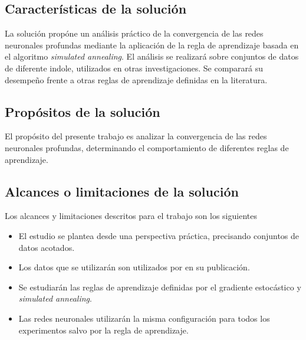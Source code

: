 








\subsection{Características de la solución}
La solución propóne un análisis práctico de la convergencia de las redes neuronales profundas mediante la aplicación de la regla de aprendizaje basada en el algoritmo {\em simulated annealing}. El análisis se realizará sobre conjuntos de datos de diferente indole, utilizados en otras investigaciones. Se comparará su desempeño frente a otras reglas de aprendizaje definidas en la literatura.

\subsection{Propósitos de la solución}
El propósito del presente trabajo es analizar la convergencia de las redes neuronales profundas, determinando el comportamiento de diferentes reglas de aprendizaje.


\subsection{Alcances o limitaciones de la solución}
Los alcances y limitaciones descritos para el trabajo son los siguientes
\begin{itemize}
	\item El estudio se plantea desde una perspectiva práctica, precisando conjuntos de datos acotados.

    \item Los datos que se utilizarán son utilizados por  en su publicación.

	\item Se estudiarán las reglas de aprendizaje definidas por el gradiente estocástico y {\em simulated annealing}.

	\item Las redes neuronales utilizarán la misma configuración para todos los experimentos salvo por la regla de aprendizaje.
\end{itemize}
